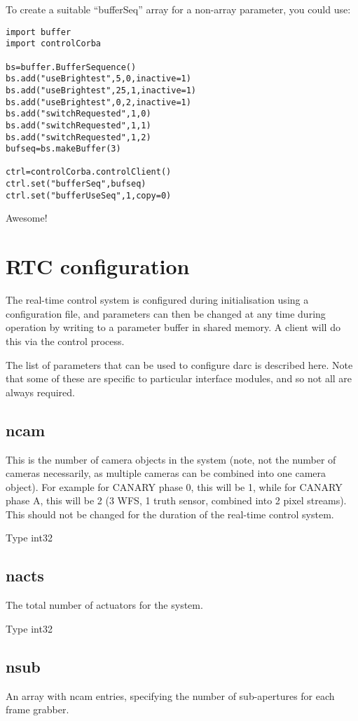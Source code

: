 \documentclass[a4,10pt]{article}
\begin{document}
To create a suitable ``bufferSeq'' array for a non-array parameter,
you could use:
\begin{verbatim}
import buffer
import controlCorba

bs=buffer.BufferSequence()
bs.add("useBrightest",5,0,inactive=1)
bs.add("useBrightest",25,1,inactive=1)
bs.add("useBrightest",0,2,inactive=1)
bs.add("switchRequested",1,0)
bs.add("switchRequested",1,1)
bs.add("switchRequested",1,2)
bufseq=bs.makeBuffer(3)

ctrl=controlCorba.controlClient()
ctrl.set("bufferSeq",bufseq)
ctrl.set("bufferUseSeq",1,copy=0)
\end{verbatim}

Awesome!




\section{RTC configuration}
The real-time control system is configured during initialisation using
a configuration file, and parameters can then be changed at
any time during operation by writing to a parameter buffer in shared
memory.  A client will do this via the control process.

The list of parameters that can be used to configure darc is described
here.  Note that some of these are specific to particular interface
modules, and so not all are always required.


\subsection{ncam}
This is the number of camera objects in the system (note, not
the number of cameras necessarily, as multiple cameras can be combined
into one camera object).  For example for CANARY phase 0, this will be
1, while for CANARY phase A, this will be 2 (3 WFS, 1 truth sensor,
combined into 2 pixel streams).  This should not be changed for the
duration of the real-time control system.

Type int32

\subsection{nacts}
The total number of actuators for the system.  

Type int32

\subsection{nsub}
An array with ncam entries, specifying the number of sub-apertures for
each frame grabber.
\end{document}
